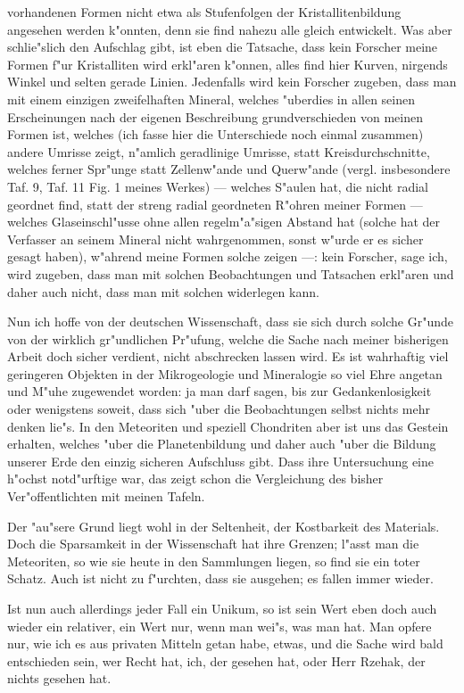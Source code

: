 \documentclass[a4paper, 12pt, oneside]{article}
\begin{document}
vorhandenen Formen nicht etwa als Stufenfolgen der Kristallitenbildung angesehen werden k"onnten, denn sie find nahezu alle gleich entwickelt. Was aber schlie"slich den Aufschlag gibt, ist eben die Tatsache, dass kein Forscher meine Formen f"ur Kristalliten wird erkl"aren k"onnen, alles find hier Kurven, nirgends Winkel und selten gerade Linien. Jedenfalls wird kein Forscher zugeben, dass man mit einem einzigen zweifelhaften Mineral, welches "uberdies in allen seinen Erscheinungen nach der eigenen Beschreibung grundverschieden von meinen Formen ist, welches (ich fasse hier die Unterschiede noch einmal zusammen) andere Umrisse zeigt, n"amlich geradlinige Umrisse, statt Kreisdurchschnitte, welches ferner Spr"unge statt Zellenw"ande und Querw"ande (vergl. insbesondere Taf. 9, Taf. 11 Fig. 1 meines Werkes) --- welches S"aulen hat, die nicht radial geordnet find, statt der streng radial geordneten R"ohren meiner Formen --- welches Glaseinschl"usse ohne allen regelm"a"sigen Abstand hat (solche hat der Verfasser an seinem Mineral nicht wahrgenommen, sonst w"urde er es sicher gesagt haben), w"ahrend meine Formen solche zeigen ---: kein Forscher, sage ich, wird zugeben, dass man mit solchen Beobachtungen und Tatsachen erkl"aren und daher auch nicht, dass man mit solchen widerlegen kann.

Nun ich hoffe von der deutschen Wissenschaft, dass sie sich durch solche Gr"unde von der wirklich gr"undlichen Pr"ufung, welche die Sache nach meiner bisherigen Arbeit doch sicher verdient, nicht abschrecken lassen wird. Es ist wahrhaftig viel geringeren Objekten in der Mikrogeologie und Mineralogie so viel Ehre angetan und M"uhe zugewendet worden: ja man darf sagen, bis zur Gedankenlosigkeit oder wenigstens soweit, dass sich "uber die Beobachtungen selbst nichts mehr denken lie"s. In den Meteoriten und speziell Chondriten aber ist uns das Gestein erhalten, welches "uber die Planetenbildung und daher auch "uber die Bildung unserer Erde den einzig sicheren Aufschluss gibt. Dass ihre Untersuchung eine h"ochst notd"urftige war, das zeigt schon die Vergleichung des bisher Ver"offentlichten mit meinen Tafeln.

Der "au"sere Grund liegt wohl in der Seltenheit, der Kostbarkeit des Materials. Doch die Sparsamkeit in der Wissenschaft hat ihre Grenzen; l"asst man die Meteoriten, so wie sie heute in den Sammlungen liegen, so find sie ein toter Schatz. Auch ist nicht zu f"urchten, dass sie ausgehen; es fallen immer wieder.

Ist nun auch allerdings jeder Fall ein Unikum, so ist sein Wert eben doch auch wieder ein relativer, ein Wert nur, wenn man wei"s, was man hat. Man opfere nur, wie ich es aus privaten Mitteln getan habe, etwas, und die Sache wird bald entschieden sein, wer Recht hat, ich, der gesehen hat, oder Herr Rzehak, der nichts gesehen hat.
\end{document}
